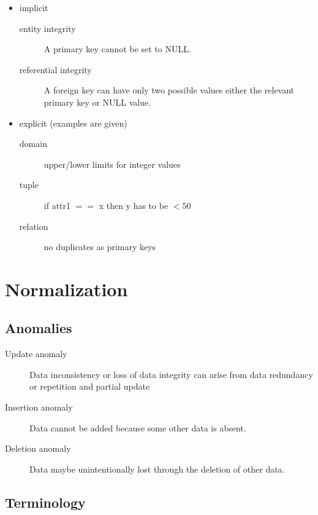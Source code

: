 \documentclass[a4paper,twocolumn]{article}
\begin{document}
\begin{itemize}
  \item implicit
    \begin{description}
      \item[entity integrity] A primary key cannot be set to NULL.
      \item[referential integrity] A foreign key can have only two
        possible values either the relevant primary key or NULL value.
    \end{description}
  \item explicit (examples are given)
    \begin{description}
      \item[domain] upper/lower limits for integer values
      \item[tuple] if attr1 $==$ x then y has to be $< 50$
      \item[relation] no duplicates as primary keys
    \end{description}
\end{itemize}

\section{Normalization}

\subsection{Anomalies}

\begin{description}
  \item[Update anomaly] Data inconsistency or loss of data integrity
    can arise from data redundancy or repetition and partial update
  \item[Insertion anomaly]
    Data cannot be added because some other data is absent.
  \item[Deletion anomaly]
    Data maybe unintentionally lost through the deletion of other data.
\end{description}

\subsection{Terminology}
\end{document}
